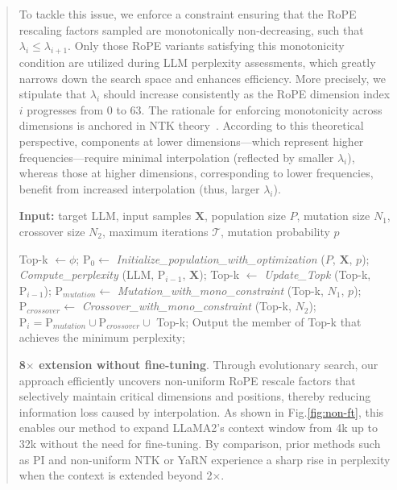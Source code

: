 \begin{abstract}
To tackle this issue, we enforce a constraint ensuring that the RoPE rescaling factors sampled are monotonically non-decreasing, such that $\lambda_i\le \lambda_{i+1}$. Only those RoPE variants satisfying this monotonicity condition are utilized during LLM perplexity assessments, which greatly narrows down the search space and enhances efficiency. More precisely, we stipulate that $\lambda_i$ should increase consistently as the RoPE dimension index $i$ progresses from $0$ to $63$. The rationale for enforcing monotonicity across dimensions is anchored in NTK theory~\cite{jacot2018neural,tancik2020fourier,ntk}. According to this theoretical perspective, components at lower dimensions—which represent higher frequencies—require minimal interpolation (reflected by smaller $\lambda_i$), whereas those at higher dimensions, corresponding to lower frequencies, benefit from increased interpolation (thus, larger $\lambda_i$).

\begin{algorithm}[t]
	\small
	\caption{The search algorithm}
	\textbf{Input:} target LLM, input samples $\mathbf{X}$, population size $P$, mutation size $N_1$, crossover size $N_2$, maximum iterations $\mathcal{T}$, mutation probability $p$\\

	\begin{algorithmic}[1]
		\label{alg:search}
		\STATE Top-k $\gets \phi$;
		\STATE $\text{P}_0 \gets$ \textit{Initialize\_population\_with\_optimization} ($P$, $\mathbf{X}$, $p$);
		\STATE \textit{Compute\_perplexity} (LLM, $\text{P}_{i-1}$, $\mathbf{X}$);
		\STATE Top-k $\gets$ \textit{Update\_Topk} (Top-k, $\text{P}_{i-1}$);
		\STATE $\text{P}_{mutation} \gets$ \textit{Mutation\_with\_mono\_constraint} (Top-k, $N_1$, $p$);
		\STATE $\text{P}_{crossover} \gets$ \textit{Crossover\_with\_mono\_constraint} (Top-k, $N_2$);
		\STATE $\text{P}_i = \text{P}_{mutation} \cup \text{P}_{crossover} \cup$ Top-k;
		\ENDFOR
		\STATE Output the member of Top-k that achieves the minimum perplexity;
	\end{algorithmic}
\end{algorithm}

\textbf{8$\times$ extension without fine-tuning}. Through evolutionary search, our approach efficiently uncovers non-uniform RoPE rescale factors that selectively maintain critical dimensions and positions, thereby reducing information loss caused by interpolation. As shown in Fig.\ref{fig:non-ft}, this enables our method to expand LLaMA2’s context window from 4k up to 32k without the need for fine-tuning. By comparison, prior methods such as PI and non-uniform NTK or YaRN experience a sharp rise in perplexity when the context is extended beyond 2$\times$.


\end{abstract}

